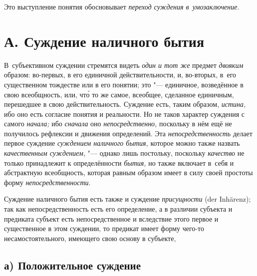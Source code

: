 Это выступление понятия обосновывает {\em переход суждения в~умозаключение}.

\section[А. Суждение наличного бытия]{А. Суждение наличного бытия}

В~субъективном суждении стремятся видеть {\em один и тот же} предмет
{\em двояким} образом: во-первых, в его единичной действительности, и,
во-вторых, в~его существенном тождестве или в его понятии; это
"--- единичное, возведённое в свою всеобщность, или, чт\'{о} то же
самое, всеобщее, сделанное единичным, перешедшее в свою действительность.
Суждение есть, таким образом, {\em истина,} ибо оно есть согласие понятия и
реальности. Но не таков характер суждения с самого {\em начала;} ибо
{\em сначала} оно {\em непосредственно,} поскольку в нём ещё не получилось
рефлексии и движения определений. Эта {\em непосредственность} делает первое
суждение {\em суждением наличного бытия,} которое можно также назвать {\em
качественным суждением,} "--- однако лишь постольку, поскольку {\em качество}
не только принадлежит к определённости {\em бытия,} но также включает в~себя и
абстрактную всеобщность, которая равным образом имеет в силу своей простоты
форму {\em непосредственности}.

Суждение наличного бытия есть также и суждение {\em присущности} (der
Inhärenz); так как непосредственность есть его определение, а в различии
субъекта и предиката субъект есть непосредственное и вследствие этого первое и
существенное в этом суждении, то предикат имеет форму чего-то
несамостоятельного, имеющего свою основу в субъекте,

\subsection[а) Положительное суждение ]{а) Положительное суждение}

